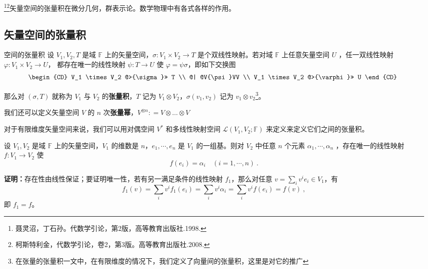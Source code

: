 
\begin{issues}
\end{issues}

\footnote{聂灵沼，丁石孙。代数学引论，第2版，高等教育出版社.1998.}\footnote{柯斯特利金，代数学引论，卷2，第3版。高等教育出版社.2008.}矢量空间的张量积在微分几何，群表示论。数学物理中有各式各样的作用。

\subsection{矢量空间的张量积}
\begin{definition}{空间的张量积}\label{def_TPofSp_1}
设 $V_1, V_2,T$ 是域 $\mathbb F$ 上的矢量空间，$\sigma: V_1 \times V_2 \rightarrow T$ 是个双线性映射。若对域 $\mathbb F$ 上任意矢量空间 $U$ ，任一双线性映射 $\varphi:V_1\times V_2\rightarrow U$， 都存在唯一的线性映射 $\psi:T\rightarrow U$ 使 $\varphi=\psi\sigma$，即如下交换图
\begin{equation}
\begin{CD}
V_1 \times V_2 @>{\sigma}>> T \\
@| @V{\psi}VV \\
V_1 \times V_2 @>{\varphi}>> U
\end{CD}~
\end{equation}

那么对 $(\sigma, T)$ 就称为 $V_1$ 与 $V_2$ 的\textbf{张量积}，$T$ 记为 $V_1 \otimes V_2$，$\sigma(v_1, v_2)$ 记为 $v_1 \otimes v_2$\footnote{在张量的张量积一文中，在有限维度的情况下，我们定义了向量间的张量积，这里是对它的推广}。

我们还可以定义矢量空间 $V$ 的 $n$ 次\textbf{张量幂}，$V^{\otimes n}: = V \otimes \dots \otimes V$
\end{definition}

对于有限维度矢量空间来说，我们可以用对偶空间 $V^*$ 和多线性映射空间 $\mathcal L(V_1,V_2;\mathbb F)$ 来定义来定义它们之间的张量积。

\begin{lemma}{}\label{lem_TPofSp_2}
设 $V_1,V_2$ 是域 $\mathbb F$ 上的矢量空间，$V_1$ 的维数是 $n$，$e_1,\cdots,e_n$ 是 $V_1$ 的一组基。则对 $V_2$ 中任意 $n$ 个元素 $\alpha_1,\cdots,\alpha_n$ ，存在唯一的线性映射 $f:V_1\rightarrow V_2$ 使
\begin{equation}
f(e_i)=\alpha_i\quad (i=1,\cdots,n)~.
\end{equation}
\end{lemma}
\textbf{证明：}存在性由线性保证；要证明唯一性，若有另一满足条件的线性映射 $f_1$，那么对任意 $v=\sum\limits_{i}v^ie_i\in V_1$，有
\begin{equation}
f_1(v)=\sum_{i}v^if_1(e_i)=\sum_{i}v^i\alpha_i=\sum_{i}v^if(e_i)=f(v)~,
\end{equation}
即 $f_1=f$。

